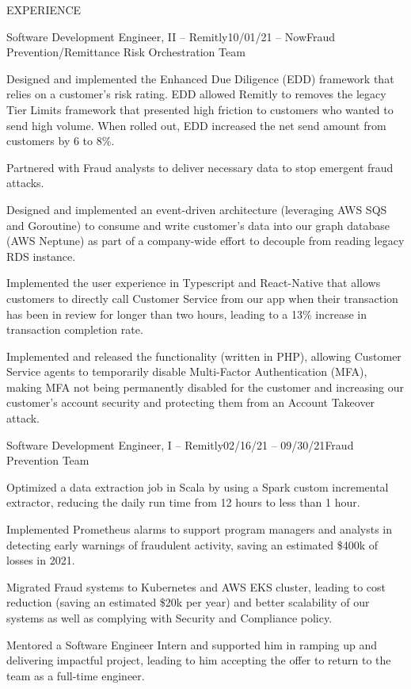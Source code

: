 \documentclass{resume} %
\begin{document}
\begin{rSection}{EXPERIENCE}

    \begin{rSubsection}{Software Development Engineer, II -- Remitly}{10/01/21 -- Now}{Fraud Prevention/Remittance Risk Orchestration Team}{}
        \item Designed and implemented the Enhanced Due Diligence (EDD) framework that relies on a customer’s risk rating. EDD allowed Remitly to removes the legacy Tier Limits framework that presented high friction to customers who wanted to send high volume. When rolled out, EDD increased the net send amount from customers by 6 to 8\%.
        \item Partnered with Fraud analysts to deliver necessary data to stop emergent fraud attacks.
        \item Designed and implemented an event-driven architecture (leveraging AWS SQS and Goroutine) to consume and write customer’s data into our graph database (AWS Neptune) as part of a company-wide effort to decouple from reading legacy RDS instance.
        \item Implemented the user experience in Typescript and React-Native that allows customers to directly call Customer Service from our app when their transaction has been in review for longer than two hours, leading to a 13\% increase in transaction completion rate.
        \item Implemented and released the functionality (written in PHP), allowing Customer Service agents to temporarily disable Multi-Factor Authentication (MFA), making MFA not being permanently disabled for the customer and increasing our customer’s account security and protecting them from an Account Takeover attack.
    \end{rSubsection}
    
    \begin{rSubsection}{Software Development Engineer, I -- Remitly}{02/16/21 -- 09/30/21}{Fraud Prevention Team}{}
        \item Optimized a data extraction job in Scala by using a Spark custom incremental extractor, reducing the daily run time from 12 hours to less than 1 hour.
        \item Implemented Prometheus alarms to support program managers and analysts in detecting early warnings of fraudulent activity, saving an estimated \$400k of losses in 2021.
        \item Migrated Fraud systems to Kubernetes and AWS EKS cluster, leading to cost reduction (saving an estimated \$20k per year) and better scalability of our systems as well as complying with Security and Compliance policy.
        \item Mentored a Software Engineer Intern and supported him in ramping up and delivering impactful project, leading to him accepting the offer to return to the team as a full-time engineer.
    \end{rSubsection}
    

\end{rSection}
\end{document}
